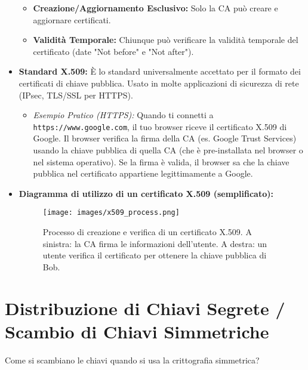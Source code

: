 \begin{itemize}
\begin{itemize}
            \item \textbf{Creazione/Aggiornamento Esclusivo:} Solo la CA può creare e aggiornare certificati.
            \item \textbf{Validità Temporale:} Chiunque può verificare la validità temporale del certificato (date "Not before" e "Not after").
        \end{itemize}
    \item \textbf{Standard X.509:} È lo standard universalmente accettato per il formato dei certificati di chiave pubblica. Usato in molte applicazioni di sicurezza di rete (IPsec, TLS/SSL per HTTPS).
        \begin{itemize}
            \item \textit{Esempio Pratico (HTTPS):} Quando ti connetti a \texttt{https://www.google.com}, il tuo browser riceve il certificato X.509 di Google. Il browser verifica la firma della CA (es. Google Trust Services) usando la chiave pubblica di quella CA (che è pre-installata nel browser o nel sistema operativo). Se la firma è valida, il browser sa che la chiave pubblica nel certificato appartiene legittimamente a Google.
        \end{itemize}
    \item \textbf{Diagramma di utilizzo di un certificato X.509 (semplificato):}
    \begin{figure}[H]
        \centering
        \texttt{[image: images/x509\_process.png]} %
        \caption{Processo di creazione e verifica di un certificato X.509. A sinistra: la CA firma le informazioni dell'utente. A destra: un utente verifica il certificato per ottenere la chiave pubblica di Bob.}
        \label{fig:x509}
    \end{figure}
\end{itemize}

\section{Distribuzione di Chiavi Segrete / Scambio di Chiavi Simmetriche}
Come si scambiano le chiavi quando si usa la crittografia simmetrica?

